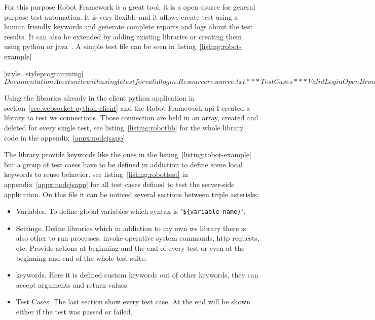 \documentclass[hidelinks,11pt,a4paper,oneside,article]{memoir}
\begin{document}
For this purpose Robot Framework is a great tool, it is a open source for general purpose test automation. It is very flexible and it allows create test using a human friendly keywords and generate complete reports and logs about the test results. It can also be extended by adding existing libraries or creating them using \gls{python} or \gls{java}~\cite{robotframe}.
A simple test file can be seen in listing~\ref{listing:robot-example}

[style=styleprogramming]$
Documentation     A test suite with a single test for valid login.
Resource          resource.txt

*** Test Cases ***
Valid Login
Open Browser To Login Page
Input Username    demo
Input Password    mode
Submit Credentials
Welcome Page Should Be Open
[Teardown]    Close Browser
$

Using the libraries already in the client python application in section~\ref{sec:websocket-python-client} and the Robot Framework \gls{api} I created a library to test \gls{ws} connections. Those connection are held in an array, created and deleted for every single test, see listing~\ref{listing:robotlib} for the whole library code in the appendix~\ref{appx:nodejsapp}.

The library provide keywords like the ones in the listing~\ref{listing:robot-example} but a group of test cases have to be defined in addiction to define some local keywords to reuse behavior. see listing~\ref{listing:robottest} in appendix~\ref{appx:nodejsapp} for all test cases defined to test the server-side application. On this file it can be noticed several sections between triple asterisks:
\begin{itemize}
    \item Variables. To define global variables which syntax is "\texttt{\$\{variable\_name\}}".
    \item Settings. Define libraries which in addiction to my own \gls{ws} library there is also other to run processes, invoke operative system commands, \gls{http} requests, etc. Provide actions at beginning and the end of every test or even at the beginning and end of the whole test suite.
    \item keywords. Here it is defined custom keywords out of other keywords, they can accept arguments and return values.
    \item Test Cases. The last section show every test case. At the end will be shown either if the test was passed or failed.
\end{itemize}
\end{document}
